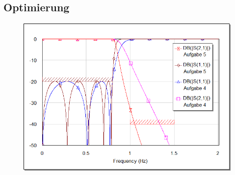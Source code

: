 \subsection{Optimierung}

\begin{figure}[h!]
    \centering
    \includegraphics[width=\linewidth]{images/graph-optimierung}
    \caption{}
    \label{fig:vor-nach-optimierung}
\end{figure}

